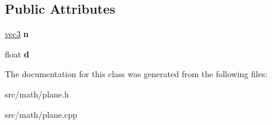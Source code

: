 \subsection*{Public Attributes}
\begin{DoxyCompactItemize}
\item 
\hypertarget{classmath_1_1plane_aa4e78c5134a44175182b2f955e57d0f0}{
\hyperlink{classmath_1_1vec3}{vec3} {\bfseries n}}
\label{classmath_1_1plane_aa4e78c5134a44175182b2f955e57d0f0}

\item 
\hypertarget{classmath_1_1plane_a20a1f2d1caa4d5cb3d81f779bb4572b0}{
float {\bfseries d}}
\label{classmath_1_1plane_a20a1f2d1caa4d5cb3d81f779bb4572b0}

\end{DoxyCompactItemize}


The documentation for this class was generated from the following files:\begin{DoxyCompactItemize}
\item 
src/math/plane.h\item 
src/math/plane.cpp\end{DoxyCompactItemize}
